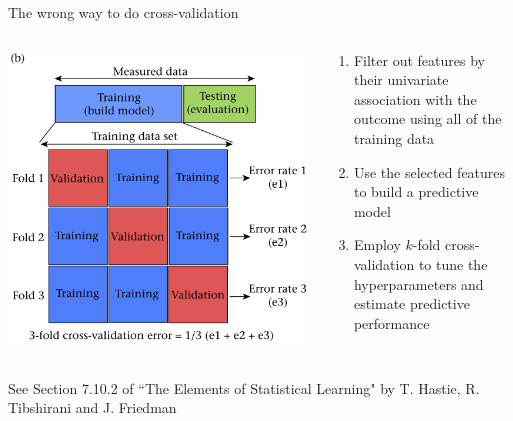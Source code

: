 \documentclass[pdf]{beamer}
\begin{document}
\begin{frame}{The wrong way to do cross-validation}

\begin{columns}

\begin{column}{0.4\textwidth}
	\begin{center}
   \includegraphics[width=.9\textwidth]{crossvalidation.png}
   \end{center}
\end{column}

\begin{column}{0.6\textwidth}
	\begin{enumerate}\addtolength{\itemsep}{1\baselineskip}
		\item Filter out features by their univariate association with the outcome using all of the training data
		\item Use the selected features to build a predictive model
		\item Employ $k$-fold cross-validation to tune the hyperparameters and estimate predictive performance
	\end{enumerate}
\end{column}

\end{columns}
\vfill
{\tiny See Section 7.10.2 of ``The Elements of Statistical Learning" by T. Hastie, R. Tibshirani and J. Friedman}
\end{frame}
\end{document}
